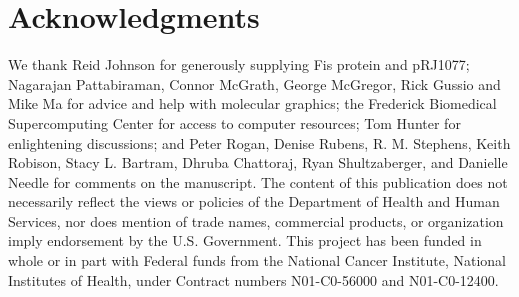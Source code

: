\documentclass[doublespacing]{narfront}
\begin{document}
\section*{Acknowledgments}
We thank Reid Johnson for generously supplying Fis protein and pRJ1077;
Nagarajan Pattabiraman, Connor McGrath, George McGregor, Rick Gussio
and
Mike Ma for
advice and help with molecular graphics;
the Frederick Biomedical Supercomputing
Center for access to computer resources;
Tom Hunter for enlightening discussions;
and
Peter Rogan,
Denise Rubens,
R. M. Stephens,
Keith Robison,
Stacy L. Bartram,
Dhruba Chattoraj,
Ryan Shultzaberger,
and
Danielle Needle
for comments on the manuscript.
   The content of this publication does not necessarily reflect the views or
   policies of the Department of Health and Human Services, nor does mention
   of trade names, commercial products, or organization imply endorsement by
   the U.S. Government.
   This project has been funded in whole
   or in part
   with Federal funds from the
   National Cancer Institute, National Institutes of Health, under Contract
   numbers N01-C0-56000
and N01-C0-12400.


\raggedright %



\clearpage
\end{document}
